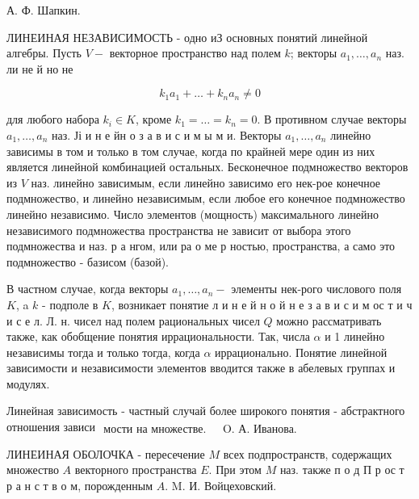 \documentclass[10pt]{article}
\begin{document}
А. Ф. Шапкин.



ЛИНЕИНАЯ НЕЗАВИСИМОСТЬ - одно иЗ основных понятий линейной алгебры. Пусть $V-$ векторное пространство над полем $k$; векторы $a_{1}, \ldots, a_{n}$ наз. ли не й но не



\[

k_{1} a_{1}+\ldots+k_{n} a_{n} \neq 0

\]



для любого набора $k_{i} \in K$, кроме $k_{1}=\ldots=k_{n}=0$. В противном случае векторы $a_{1}, \ldots, a_{n}$ наз. Јі и н е йн о з а в и с и м ы м и. Векторы $a_{1}, \ldots, a_{n}$ линейно зависимы в том и только в том случае, когда по крайней мере один из них является линейной комбинацией остальных. Бесконечное подмножество векторов из $V$ наз. линейно зависимым, если линейно зависимо его нек-рое конечное подмножество, и линейно независимым, если любое его конечное подмножество линейно независимо. Число элементов (мощность) максимального линейно независимого подмножества пространства не зависит от выбора этого подмножества и наз. р а нгом, или ра $о$ ме р ностью, пространства, а само это подмножество - базисом (базой).



В частном случае, когда векторы $a_{1}, \ldots, a_{n}-$ элементы нек-рого числового поля $K$, a $k$ - подполе в $K$, возникает понятие л и н е й н о й н е з а в и с и м ос т и ч и с е л. Л. н. чисел над полем рациональных чисел $Q$ можно рассматривать также, как обобщение понятия иррациональности. Так, числа $\alpha$ и 1 линейно независимы тогда и только тогда, когда $\alpha$ иррационально. Понятие линейной зависимости и независимости элементов вводится также в абелевых группах и модулях.



Линейная зависимость - частный случай более широкого понятия - абстрактного отношения зависи$\begin{array}{ll}\text { мости на множестве. } & \text { O. А. Иванова. }\end{array}$



ЛИНЕИНАЯ ОБОЛОЧКА - пересечение $M$ всех подпространств, содержащих множество $A$ векторного пространства $E$. При этом $M$ наз. также п о д П р ос т р а н с т в о м, порожденным $A$. M. И. Войцеховский.
\end{document}

